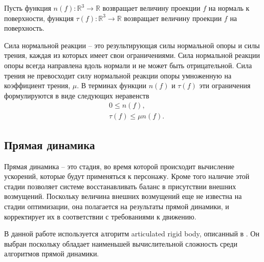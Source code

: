 Пусть функция $n(f): \mathbb{R}^{3} \rightarrow \mathbb{R}$ возвращает величину проекции $f$ на нормаль к поверхности, функция $\tau(f): \mathbb{R}^{3} \rightarrow \mathbb{R}$ возвращает величину проекции $f$ на поверхность.

Сила нормальной реакции -- это результирующая силы нормальной опоры и силы трения, каждая из которых имеет свои ограничениями. Сила нормальной реакции опоры всегда направлена вдоль нормали и не может быть отрицательной. Сила трения не превосходит силу нормальной реакции опоры умноженную на коэффициент трения, $\mu$. В терминах функции $n(f)$ и $\tau(f)$ эти ограничения формулируются в виде следующих неравенств
\begin{align*}
&\ 0 \le n(f), \tag{2.18}\label{ineq:2.18} \\
&\ \tau(f) \le \mu n(f). \tag{2.19}\label{ineq:2.19}
\end{align*}

\subsection{Прямая динамика}

Прямая динамика -- это стадия, во время которой происходит вычисление ускорений, которые будут применяться к персонажу. Кроме того наличие этой стадии позволяет системе восстанавливать баланс в присутствии внешних возмущений. Поскольку величина внешних возмущений еще не известна на стадии оптимизации, она полагается на результаты прямой динамики, и корректирует их в соответствии с требованиями к движению.

В данной работе используется алгоритм articulated rigid body, описанный в \cite{Featherstone}. Он выбран поскольку обладает наименьшей вычислительной сложность среди алгоритмов прямой динамики.
